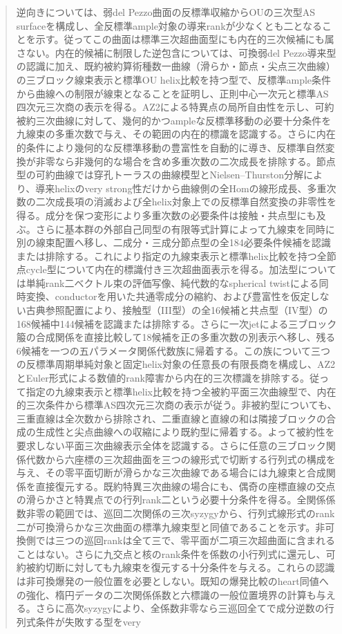 \documentclass[11pt,a4paper]{ltjsarticle}
\theoremstyle{definition}
\begin{document}
\begin{abstract}
逆向きについては、弱del Pezzo曲面の反標準収縮からOUの三次型AS surfaceを構成し、全反標準ample対象の導来rankが少なくとも二となることを示す。従ってこの曲面は標準三次超曲面型にも内在的三次候補にも属さない。内在的候補に制限した逆包含については、可換弱del Pezzo導来型の認識に加え、既約被約算術種数一曲線（滑らか・節点・尖点三次曲線）の三ブロック線束表示と標準OU helix比較を持つ型で、反標準ample条件から曲線への制限が線束となることを証明し、正則中心一次元と標準AS四次元三次商の表示を得る。AZ2による特異点の局所自由性を示し、可約被約三次曲線に対して、幾何的かつampleな反標準移動の必要十分条件を九線束の多重次数で与え、その範囲の内在的標識を認識する。さらに内在的条件により幾何的な反標準移動の豊富性を自動的に導き、反標準自然変換が非零なら非幾何的な場合を含め多重次数の二次成長を排除する。節点型の可約曲線では穿孔トーラスの曲線模型とNielsen--Thurston分解により、導来helixのvery strong性だけから曲線側の全Homの線形成長、多重次数の二次成長項の消滅および全helix対象上での反標準自然変換の非零性を得る。成分を保つ変形により多重次数の必要条件は接触・共点型にも及ぶ。さらに基本群の外部自己同型の有限等式計算によって九線束を同時に別の線束配置へ移し、二成分・三成分節点型の全184必要条件候補を認識または排除する。これにより指定の九線束表示と標準helix比較を持つ全節点cycle型について内在的標識付き三次超曲面表示を得る。加法型については単純rank二ベクトル束の評価写像、純代数的なspherical twistによる同時変換、conductorを用いた共通零成分の縮約、および豊富性を仮定しない古典参照配置により、接触型（III型）の全16候補と共点型（IV型）の168候補中144候補を認識または排除する。さらに一次jetによる三ブロック箙の合成関係を直接比較して18候補を正の多重次数の別表示へ移し、残る6候補を一つの五パラメータ関係代数族に帰着する。この族について三つの反標準周期単純対象と固定helix対象の任意長の有限長商を構成し、AZ2とEuler形式による数値的rank障害から内在的三次標識を排除する。従って指定の九線束表示と標準helix比較を持つ全被約平面三次曲線型で、内在的三次条件から標準AS四次元三次商の表示が従う。非被約型についても、三重直線は全次数から排除され、二重直線と直線の和は隣接ブロックの合成の生成性と尖点曲線への収縮により既約型に帰着する。よって被約性を要求しない平面三次曲線表示全体を認識する。さらに任意の三ブロック関係代数から六座標の三次超曲面を三つの線形式で切断する行列式の構成を与え、その零平面切断が滑らかな三次曲線である場合には九線束と合成関係を直接復元する。既約特異三次曲線の場合にも、偶奇の座標直線の交点の滑らかさと特異点での行列rank二という必要十分条件を得る。全関係係数非零の範囲では、巡回二次関係の三次syzygyから、行列式線形式のrank二が可換滑らかな三次曲面の標準九線束型と同値であることを示す。非可換側では三つの巡回rankは全て三で、零平面が二項三次超曲面に含まれることはない。さらに九交点と核のrank条件を係数の小行列式に還元し、可約被約切断に対しても九線束を復元する十分条件を与える。これらの認識は非可換爆発の一般位置を必要としない。既知の爆発比較のheart同値への強化、楕円データの二次関係係数と六標識の一般位置境界の計算も与える。さらに高次syzygyにより、全係数非零なら三巡回全てで成分逆数の行列式条件が失敗する型をvery 
\end{abstract}
\end{document}
